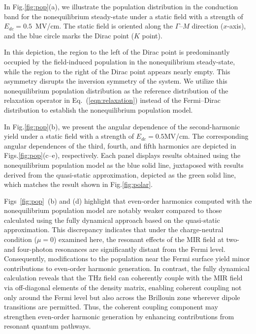 In Fig.\ref{fig:pop}(a), we illustrate the population distribution in the conduction band for the nonequilibrium steady-state under a static field with a strength of $E_{dc}=0.5$~MV/cm. The static field is oriented along the $\Gamma$--$M$ direction ($x$-axis), and the blue circle marks the Dirac point ($K$ point).

In this depiction, the region to the left of the Dirac point is predominantly occupied by the field-induced population in the nonequilibrium steady-state, while the region to the right of the Dirac point appears nearly empty. This asymmetry disrupts the inversion symmetry of the system. We utilize this nonequilibrium population distribution as the reference distribution of the relaxation operator in Eq.~(\ref{eqn:relaxation}) instead of the Fermi--Dirac distribution to establish the nonequilibrium population model.

In Fig.\ref{fig:pop}(b), we present the angular dependence of the second-harmonic yield under a static field with a strength of $E_{dc}=0.5$MV/cm. The corresponding angular dependences of the third, fourth, and fifth harmonics are depicted in Figs.\ref{fig:pop}(c--e), respectively. Each panel displays results obtained using the nonequilibrium population model as the blue solid line, juxtaposed with results derived from the quasi-static approximation, depicted as the green solid line, which matches the result shown in Fig.\ref{fig:polar}.

Figs~\ref{fig:pop}~(b) and (d) highlight that even-order harmonics computed with the nonequilibrium population model are notably weaker compared to those calculated using the fully dynamical approach based on the quasi-static approximation. This discrepancy indicates that under the charge-neutral condition ($\mu=0$) examined here, the resonant effects of the MIR field at two- and four-photon resonances are significantly distant from the Fermi level. Consequently, modifications to the population near the Fermi surface yield minor contributions to even-order harmonic generation. In contrast, the fully dynamical calculation reveals that the THz field can coherently couple with the MIR field via off-diagonal elements of the density matrix, enabling coherent coupling not only around the Fermi level but also across the Brillouin zone wherever dipole transitions are permitted. Thus, the coherent coupling component may strengthen even-order harmonic generation by enhancing contributions from resonant quantum pathways.

